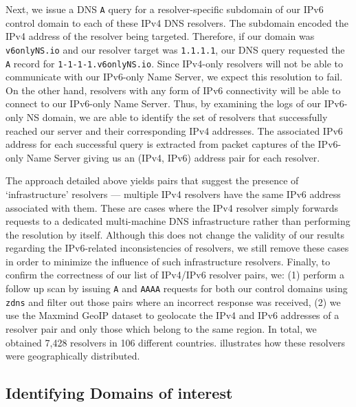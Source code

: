 Next, we issue a DNS {\tt A} query for a resolver-specific subdomain of our
IPv6 control domain to each of these IPv4 DNS resolvers. The subdomain encoded
the IPv4 address of the resolver being targeted. Therefore, if our domain was
{\tt v6onlyNS.io} and our resolver target was {\tt 1.1.1.1}, our DNS query
requested the {\tt A} record for {\tt 1-1-1-1.v6onlyNS.io}.
%
Since IPv4-only resolvers will not be able to communicate with our IPv6-only
Name Server, we expect this resolution to fail. On the other hand, resolvers
with any form of IPv6 connectivity will be able to connect to our IPv6-only
Name Server.
%
Thus, by examining the logs of our IPv6-only NS domain, we are able
to identify the set of resolvers that successfully reached our server and
their corresponding IPv4 addresses. The associated IPv6 address for each
successful query is extracted from packet captures of the IPv6-only Name
Server giving us an (IPv4, IPv6) address pair for each resolver.

The approach detailed above yields pairs that suggest the presence of
`infrastructure' resolvers --- \eg multiple IPv4 resolvers have the same IPv6
address associated with them. These are cases where the IPv4 resolver simply
forwards requests to a dedicated multi-machine DNS infrastructure rather than
performing the resolution by itself. Although this does not change the validity
of our results regarding the IPv6-related inconsistencies of resolvers, we
still remove these cases in order to minimize the influence of such
infrastructure resolvers.
%
Finally, to confirm the correctness of our list of IPv4/IPv6 resolver pairs,
we: (1) perform a follow up scan by issuing {\tt A} and {\tt AAAA} requests for
both our control domains using {\tt zdns} \cite{Durumeric13zmap} and filter out
those pairs where an incorrect response was received, (2) we use the Maxmind
GeoIP dataset \cite{maxmind-connectiondb} to geolocate the IPv4 and IPv6
addresses of a resolver pair and only those which belong to the same region.
% 
In total, we obtained 7,428 resolvers in 106 different countries.
 illustrates how these resolvers were
geographically distributed.


\subsection{Identifying Domains of interest}\label{sec:methodology:domains}

